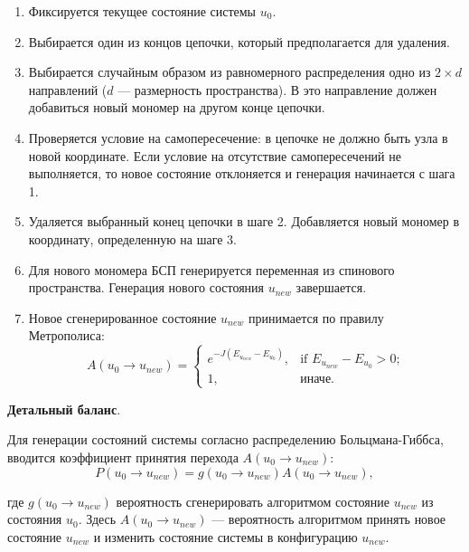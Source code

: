  \begin{enumerate}
\item Фиксируется  текущее состояние системы  $u_0$. 

\item  Выбирается один из концов цепочки, который предполагается для удаления. 

\item  Выбирается случайным образом из равномерного   распределения одно из  $2 \times d$ направлений ($d $ --- размерность пространства). В это направление должен добавиться новый мономер на другом конце цепочки. 

\item Проверяется условие на самопересечение: в цепочке не должно быть узла в новой координате. Если условие на отсутствие самопересечений не выполняется, то новое состояние отклоняется и генерация начинается с шага 1.

 \item Удаляется выбранный конец цепочки в шаге 2. Добавляется новый мономер в координату, определенную на шаге 3. 

 \item Для нового мономера БСП генерируется  переменная из спинового пространства. Генерация нового состояния $u_{new}$  завершается. 
 
 
 \item  Новое сгенерированное состояние  $u_{new}$ принимается по правилу Метрополиса:
 \begin{equation}
 	\label{accratios}
 	A(u_0  \rightarrow u_{new} ) =  
 	\begin{cases}
 		e^{-J(E_{u_{new}}-E_{u_0})}, & \text{if $E_{u_{new}}-E_{u_0}>0$;}\\
 		1, & \text{иначе}.
 	\end{cases} 
  \end{equation}


\end{enumerate}

  \textbf{Детальный баланс}. 

Для генерации состояний системы согласно распределению Больцмана-Гиббса, вводится коэффициент принятия перехода $A(u_0  \rightarrow u_{new} )$: 
\begin{equation*}
	P(u_0  \rightarrow u_{new} ) = g(u_0  \rightarrow u_{new} ) A(u_0  \rightarrow u_{new} ),
\end{equation*}

где $g(u_0  \rightarrow u_{new} )$ вероятность  сгенерировать алгоритмом  состояние $u_{new} $ из состояния  $u_0$. 
 Здесь $ A(u_0  \rightarrow u_{new} )$ --- вероятность алгоритмом принять новое состояние $u_{new} $ и изменить состояние системы в   конфигурацию $u_{new} $. 
 
